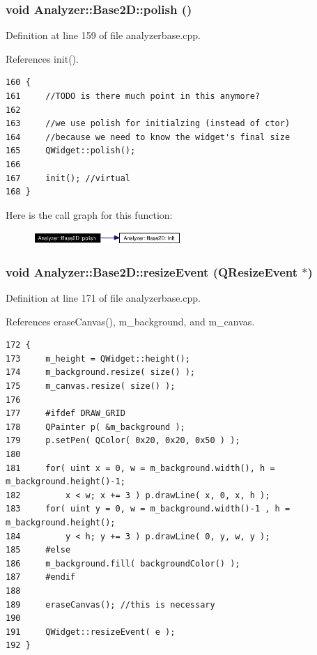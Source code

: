 \subsubsection{\setlength{\rightskip}{0pt plus 5cm}void Analyzer::Base2D::polish ()\hspace{0.3cm}{\tt  [protected]}}\label{classAnalyzer_1_1Base2D_Sonogramb5}




Definition at line 159 of file analyzerbase.cpp.

References init().



\footnotesize\begin{verbatim}160 {
161     //TODO is there much point in this anymore?
162 
163     //we use polish for initialzing (instead of ctor)
164     //because we need to know the widget's final size
165     QWidget::polish();
166 
167     init(); //virtual
168 }
\end{verbatim}\normalsize 


Here is the call graph for this function:\begin{figure}[H]
\begin{center}
\leavevmode
\includegraphics[width=159pt]{classAnalyzer_1_1Base2D_Sonogramb5_cgraph}
\end{center}
\end{figure}
\subsubsection{\setlength{\rightskip}{0pt plus 5cm}void Analyzer::Base2D::resize\-Event (QResize\-Event $\ast$)\hspace{0.3cm}{\tt  [protected]}}\label{classAnalyzer_1_1Base2D_Sonogramb3}




Definition at line 171 of file analyzerbase.cpp.

References erase\-Canvas(), m\_\-background, and m\_\-canvas.



\footnotesize\begin{verbatim}172 {
173     m_height = QWidget::height();
174     m_background.resize( size() );
175     m_canvas.resize( size() );
176 
177     #ifdef DRAW_GRID
178     QPainter p( &m_background );
179     p.setPen( QColor( 0x20, 0x20, 0x50 ) );
180 
181     for( uint x = 0, w = m_background.width(), h = m_background.height()-1;
182         x < w; x += 3 ) p.drawLine( x, 0, x, h );
183     for( uint y = 0, w = m_background.width()-1 , h = m_background.height();
184         y < h; y += 3 ) p.drawLine( 0, y, w, y );
185     #else
186     m_background.fill( backgroundColor() );
187     #endif
188 
189     eraseCanvas(); //this is necessary
190 
191     QWidget::resizeEvent( e );
192 }
\end{verbatim}\normalsize 


